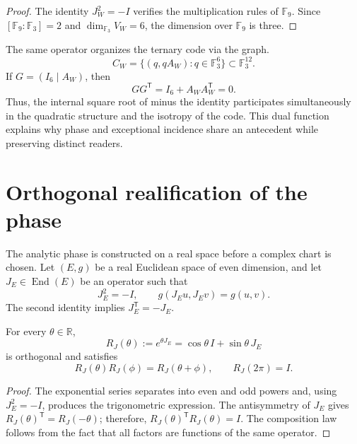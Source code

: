 \begin{proof}
The identity \(J_W^2=-I\) verifies the multiplication rules of
\(\mathbb F_9\). Since
\([\mathbb F_9:\mathbb F_3]=2\) and
\(\dim_{\mathbb F_3}V_W=6\), the dimension over \(\mathbb F_9\) is three.
\end{proof}

The same operator organizes the ternary code via the graph.
\begin{equation}
 C_W=\{(q,qA_W):q\in\mathbb F_3^6\}\subset\mathbb F_3^{12}.
 \label{eq:codigo-grafo-J-anexo}
\end{equation}
If \(G=(I_6\mid A_W)\), then
\[
 GG^{\mathsf T}=I_6+A_W A_W^{\mathsf T}=0.
\]
Thus, the internal square root of minus the identity participates simultaneously in the
quadratic structure and the isotropy of the code. This dual function explains
why phase and exceptional incidence share an antecedent while
preserving distinct readers.

\section{Orthogonal realification of the phase}

The analytic phase is constructed on a real space before a complex
chart is chosen. Let \((E,g)\) be a real Euclidean space of even dimension, and let
\(J_E\in\operatorname{End}(E)\) be an operator such that
\begin{equation}
 J_E^2=-I,
 \qquad
 g(J_Eu,J_Ev)=g(u,v).
 \label{eq:estructura-compleja-ortogonal-anexo}
\end{equation}
The second identity implies \(J_E^{\mathsf T}=-J_E\).

\begin{proposition}
\label{prop:fase-ortogonal-J-anexo}
For every \(\theta\in\mathbb R\),
\begin{equation}
 R_J(\theta):=e^{\theta J_E}
 =\cos\theta\,I+\sin\theta\,J_E
 \label{eq:rotacion-J-anexo}
\end{equation}
is orthogonal and satisfies
\begin{equation}
 R_J(\theta)R_J(\phi)=R_J(\theta+\phi),
 \qquad R_J(2\pi)=I.
 \label{eq:grupo-fase-J-anexo}
\end{equation}
\end{proposition}

\begin{proof}
The exponential series separates into even and odd powers and, using
\(J_E^2=-I\), produces the trigonometric expression. The antisymmetry of
\(J_E\) gives
\(R_J(\theta)^{\mathsf T}=R_J(-\theta)\); therefore,
\(R_J(\theta)^{\mathsf T}R_J(\theta)=I\). The composition law follows from the fact
that all factors are functions of the same operator.
\end{proof}

